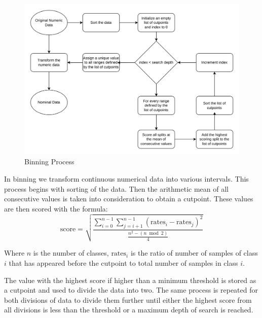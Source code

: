 \documentclass[pdflatex,sn-mathphys-num]{sn-jnl}%
\let\oldcaption\caption
\renewcommand{\caption}[1]{\oldcaption{\centering #1}}
\theoremstyle{thmstyleone}%
\theoremstyle{thmstyletwo}%
\theoremstyle{thmstylethree}%
\begin{document}
\begin{figure}[ht!]
    \centering
    \includegraphics[width=0.5\linewidth]{Binning.drawio.png}
    \caption{Binning Process}
    \label{fig:Binning}
\end{figure}

In binning we transform continuous numerical data into various intervals.
This process begins with sorting of the data.
Then the arithmetic mean of all consecutive values is taken into consideration to obtain a cutpoint.
These values are then scored with the formula:
\[
\text{score} = \sqrt{\frac{\sum_{i=0}^{n-1} \sum_{j=i+1}^{n-1} (\text{rates}_i - \text{rates}_j)^2}{\frac{n^2 - (n \bmod 2)}{4}}}
\]
\begin{center}
\footnotesize{Where \(n\) is the number of classes, \(\text{rates}_i\) is the ratio of number of samples of class \(i\) that has appeared before the cutpoint to total number of samples in class \(i\).}
\end{center}

The value with the highest score if higher than a minimum threshold is stored as a cutpoint and used to divide the data into two.
The same process is repeated for both divisions of data to divide them further until either the highest score from all divisions is less than the threshold or a maximum depth of search is reached.
\end{document}
